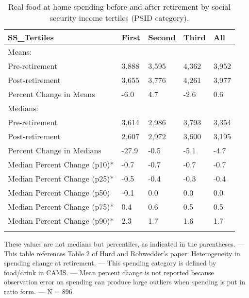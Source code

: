 \begin{table}[tbp] \centering
{}

\caption{Real food at home spending before and after retirement by social security income tertiles (PSID category).}
\begin{tabularx}{\textwidth}{lCCCC}

\toprule
{SS\_Tertiles}&{First}&{Second}&{Third}&{All} \tabularnewline
\midrule\addlinespace[1.5ex]
Means:&&&& \tabularnewline
\midrule Pre-retirement&3,888&3,595&4,362&3,952 \tabularnewline
Post-retirement&3,655&3,776&4,261&3,977 \tabularnewline
Percent Change in Means&-6.0&4.7&-2.6&0.6 \tabularnewline
\midrule Medians:&&&& \tabularnewline
\midrule Pre-retirement&3,614&2,986&3,793&3,354 \tabularnewline
Post-retirement&2,607&2,972&3,600&3,195 \tabularnewline
Percent Change in Medians&-27.9&-0.5&-5.1&-4.7 \tabularnewline
Median Percent Change (p10)*&-0.7&-0.7&-0.7&-0.7 \tabularnewline
Median Percent Change (p25)*&-0.5&-0.4&-0.3&-0.4 \tabularnewline
Median Percent Change (p50)&-0.1&0.0&0.0&0.0 \tabularnewline
Median Percent Change (p75)*&0.4&0.6&0.5&0.5 \tabularnewline
Median Percent Change (p90)*&2.3&1.7&1.6&1.7 \tabularnewline
\bottomrule \addlinespace[1.5ex]

\end{tabularx}
\begin{flushleft}
\footnotesize *These values are not medians but percentiles, as indicated in the parentheses. \linebreak --- \linebreak This table references Table 2 of Hurd and Rohwedder's paper: Heterogeneity in spending change at retirement. \linebreak --- \linebreak This spending category is defined by food/drink in CAMS. \linebreak --- \linebreak Mean percent change is not reported because observation error on spending can produce large outliers when spending is put in ratio form. \linebreak --- \linebreak N = 896.
\end{flushleft}
\end{table}
